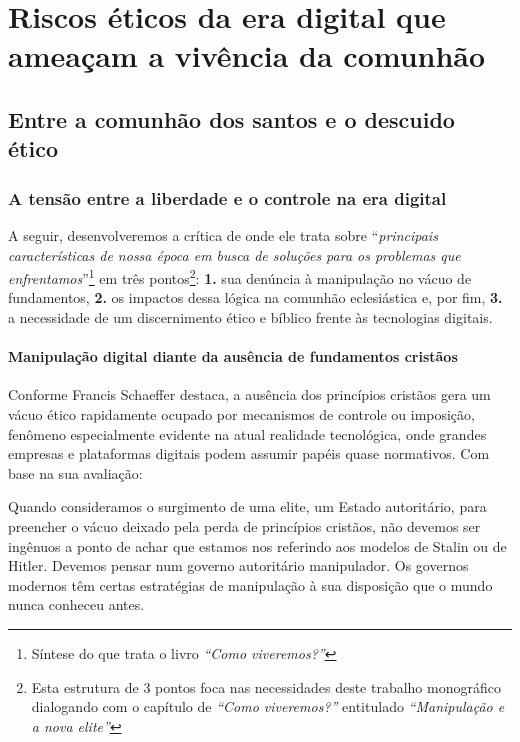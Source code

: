 \chapter{Riscos éticos da era digital que ameaçam a vivência da comunhão}

\section{Entre a comunhão dos santos e o descuido ético}

\subsection{A tensão entre a liberdade e o controle na era digital}

A seguir, desenvolveremos a crítica de  onde ele trata sobre ``\textit{principais características de nossa época em busca de soluções para os problemas que enfrentamos}''\footnote{Síntese do que trata o livro \textit{``Como viveremos?''}\cite{schaeffer2002}} em três pontos\footnote{Esta estrutura de 3 pontos foca nas necessidades deste trabalho monográfico dialogando com o capítulo de \textit{``Como viveremos?''} entitulado \textit{``Manipulação e a nova elite''}}: \textbf{1.} sua denúncia à manipulação no vácuo de fundamentos, \textbf{2.} os impactos dessa lógica na comunhão eclesiástica e, por fim, \textbf{3.} a necessidade de um discernimento ético e bíblico frente às tecnologias digitais.

\subsubsection{Manipulação digital diante da ausência de fundamentos cristãos}

Conforme Francis Schaeffer destaca, a ausência dos princípios cristãos gera um vácuo ético rapidamente ocupado por mecanismos de controle ou imposição, fenômeno especialmente evidente na atual realidade tecnológica, onde grandes empresas e plataformas digitais podem assumir papéis quase normativos. Com base na sua avaliação:

\begin{citacao}
    Quando consideramos o surgimento de uma elite, um Estado autoritário, para preencher o vácuo deixado pela perda de princípios cristãos, não devemos ser ingênuos a ponto de achar que estamos nos referindo aos modelos de Stalin ou de Hitler. Devemos pensar num governo autoritário manipulador. Os governos modernos têm certas estratégias de manipulação à sua disposição que o mundo nunca conheceu antes. \cite[p.~168]{schaeffer2002}
\end{citacao}

